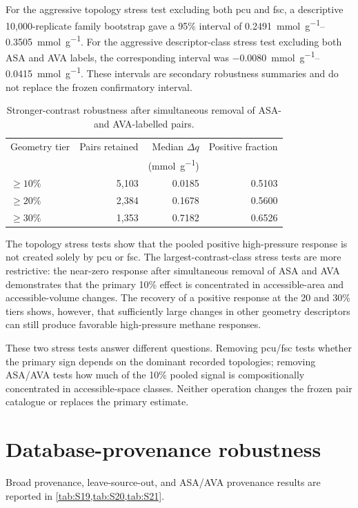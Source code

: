 \documentclass[11pt,a4paper]{article}
\begin{document}
For the aggressive topology stress test excluding both pcu and fsc, a descriptive
10,000-replicate family bootstrap gave a 95\% interval of
\SIrange{0.2491}{0.3505}{\milli\mole\per\gram}. For the aggressive descriptor-class stress
test excluding both ASA and AVA labels, the corresponding interval was
\SIrange{-0.0080}{0.0415}{\milli\mole\per\gram}. These intervals are secondary
robustness summaries and do not replace the frozen confirmatory interval.

\begin{table}[H]
\centering
\caption{Stronger-contrast robustness after simultaneous removal of ASA- and
AVA-labelled pairs.}
\label{tab:S18}
\begin{tabular}{lrrr}
\toprule
Geometry tier & Pairs retained & Median $\Delta q$ & Positive fraction \\
 & & (\si{\milli\mole\per\gram}) & \\
\midrule
$\geq10\%$ & 5,103 & 0.0185 & 0.5103 \\
$\geq20\%$ & 2,384 & 0.1678 & 0.5600 \\
$\geq30\%$ & 1,353 & 0.7182 & 0.6526 \\
\bottomrule
\end{tabular}
\end{table}

The topology stress tests show that the pooled positive high-pressure response is
not created solely by pcu or fsc. The largest-contrast-class stress tests are more restrictive:
the near-zero response after simultaneous removal of ASA and AVA demonstrates that
the primary 10\% effect is concentrated in accessible-area and accessible-volume
changes. The recovery of a positive response at the 20 and 30\% tiers shows,
however, that sufficiently large changes in other geometry descriptors can still
produce favorable high-pressure methane responses.

These two stress tests answer different questions. Removing pcu/fsc tests whether
the primary sign depends on the dominant recorded topologies; removing ASA/AVA
tests how much of the 10\% pooled signal is compositionally concentrated in
accessible-space classes. Neither operation changes the frozen pair catalogue or
replaces the primary estimate.


\section{Database-provenance robustness}
\label{sec:provenance}

Broad provenance, leave-source-out, and ASA/AVA provenance results are reported in
\cref{tab:S19,tab:S20,tab:S21}.
\end{document}
